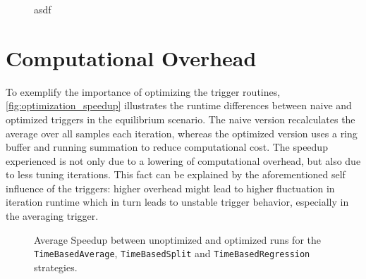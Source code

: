 \begin{figure}[htpb]
	\centering
%	
	\caption{asdf}
	\label{fig:rebuild_times}
\end{figure}



\section{Computational Overhead}
To exemplify the importance of optimizing the trigger routines, \autoref{fig:optimization_speedup} illustrates the runtime differences between naive and optimized triggers in the equilibrium scenario. The naive version recalculates the average over all samples each iteration, whereas the optimized version uses a ring buffer and running summation to reduce computational cost.
The speedup experienced is not only due to a lowering of computational overhead, but also due to less tuning iterations. This fact can be explained by the aforementioned self influence of the triggers: higher overhead might lead to higher fluctuation in iteration runtime which in turn leads to unstable trigger behavior, especially in the averaging trigger.


\begin{figure}[htpb]
	\centering
	\caption{Average Speedup between unoptimized and optimized runs for the \texttt{TimeBasedAverage}, \texttt{TimeBasedSplit} and \texttt{TimeBasedRegression} strategies.}
	\label{fig:optimization_speedup}
\end{figure}



